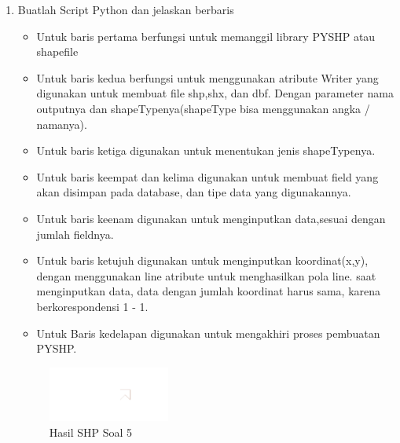 \begin{enumerate}
	\item Buatlah Script Python dan jelaskan berbaris
	
	\begin{itemize}
		\item Untuk baris pertama berfungsi untuk memanggil library PYSHP atau shapefile
		\item Untuk baris kedua berfungsi untuk menggunakan atribute Writer yang digunakan untuk membuat file shp,shx, dan dbf. \hfill\break Dengan parameter nama outputnya dan shapeTypenya(shapeType bisa menggunakan angka / namanya).
		\item Untuk baris ketiga digunakan untuk menentukan jenis shapeTypenya.
		\item Untuk baris keempat dan kelima digunakan untuk membuat field yang akan disimpan pada database, dan tipe data yang digunakannya.
		\item Untuk baris keenam digunakan untuk menginputkan data,sesuai dengan jumlah fieldnya.
		\item Untuk baris ketujuh digunakan untuk menginputkan koordinat(x,y), dengan menggunakan line atribute untuk menghasilkan pola line. \hfill\break
		saat menginputkan data, data dengan jumlah koordinat harus sama, karena berkorespondensi 1 - 1.
		\item Untuk Baris kedelapan digunakan untuk mengakhiri proses pembuatan PYSHP.
	\end{itemize}
	\hfill\break
	\begin{figure}[H]
		\includegraphics[width=4cm]{figures/1174095/2/5.png}
		\centering
		\caption{Hasil SHP Soal 5}
	\end{figure}


\end{enumerate}
